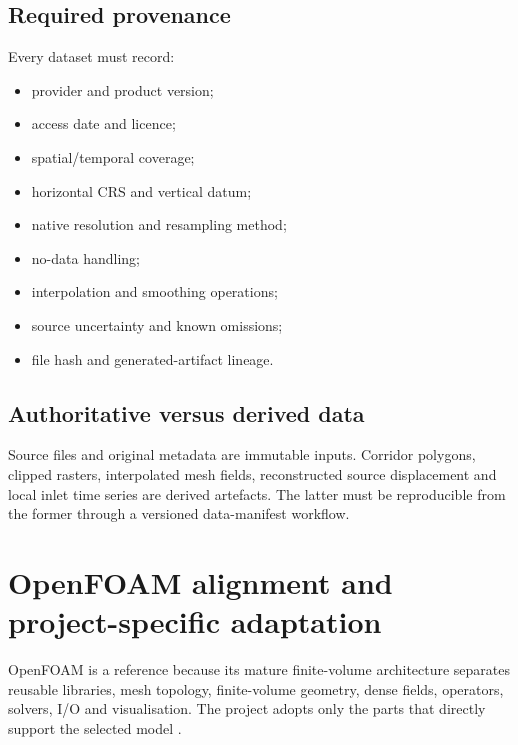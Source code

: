 \documentclass[11pt,a4paper]{article}
\begin{document}
\subsection{Required provenance}

Every dataset must record:
\begin{itemize}
  \item provider and product version;
  \item access date and licence;
  \item spatial/temporal coverage;
  \item horizontal CRS and vertical datum;
  \item native resolution and resampling method;
  \item no-data handling;
  \item interpolation and smoothing operations;
  \item source uncertainty and known omissions;
  \item file hash and generated-artifact lineage.
\end{itemize}

\subsection{Authoritative versus derived data}

Source files and original metadata are immutable inputs. Corridor polygons, clipped rasters, interpolated mesh fields, reconstructed source displacement and local inlet time series are derived artefacts. The latter must be reproducible from the former through a versioned data-manifest workflow.

\section{OpenFOAM alignment and project-specific adaptation}

OpenFOAM is a reference because its mature finite-volume architecture separates reusable libraries, mesh topology, finite-volume geometry, dense fields, operators, solvers, I/O and visualisation. The project adopts only the parts that directly support the selected model \cite{openfoamReview}.
\end{document}
